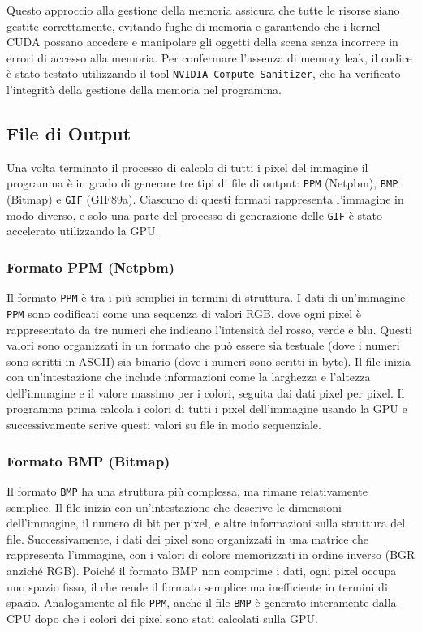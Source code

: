 \documentclass{article}
\begin{document}
Questo approccio alla gestione della memoria assicura che tutte le risorse siano gestite correttamente, evitando fughe di memoria e garantendo che i kernel CUDA possano accedere e manipolare gli oggetti della scena senza incorrere in errori di accesso alla memoria. Per confermare l'assenza di memory leak, il codice è stato testato utilizzando il tool \texttt{NVIDIA Compute Sanitizer}\cite{NVIDIA-Compute-Sanitizer}, che ha verificato l'integrità della gestione della memoria nel programma.

\subsection{File di Output}

Una volta terminato il processo di calcolo di tutti i pixel del immagine il programma è in grado di generare tre tipi di file di output: \texttt{PPM} (Netpbm)\cite{PPM}, \texttt{BMP} (Bitmap)\cite{BMP} e \texttt{GIF} (GIF89a)\cite{GIF}. Ciascuno di questi formati rappresenta l'immagine in modo diverso, e solo una parte del processo di generazione delle \texttt{GIF} è stato accelerato utilizzando la GPU.

\subsubsection{Formato PPM (Netpbm)}

Il formato \texttt{PPM} è tra i più semplici in termini di struttura. I dati di un'immagine \texttt{PPM} sono codificati come una sequenza di valori RGB, dove ogni pixel è rappresentato da tre numeri che indicano l'intensità del rosso, verde e blu. Questi valori sono organizzati in un formato che può essere sia testuale (dove i numeri sono scritti in ASCII) sia binario (dove i numeri sono scritti in byte). Il file inizia con un'intestazione che include informazioni come la larghezza e l'altezza dell'immagine e il valore massimo per i colori, seguita dai dati pixel per pixel.
Il programma prima calcola i colori di tutti i pixel dell'immagine usando la GPU e successivamente scrive questi valori su file in modo sequenziale.

\subsubsection{Formato BMP (Bitmap)}

Il formato \texttt{BMP} ha una struttura più complessa, ma rimane relativamente semplice. Il file inizia con un'intestazione che descrive le dimensioni dell'immagine, il numero di bit per pixel, e altre informazioni sulla struttura del file. Successivamente, i dati dei pixel sono organizzati in una matrice che rappresenta l’immagine, con i valori di colore memorizzati in ordine inverso (BGR anziché RGB). Poiché il formato BMP non comprime i dati, ogni pixel occupa uno spazio fisso, il che rende il formato semplice ma inefficiente in termini di spazio. Analogamente al file \texttt{PPM}, anche il file \texttt{BMP} è generato interamente dalla CPU dopo che i colori dei pixel sono stati calcolati sulla GPU.
\end{document}
